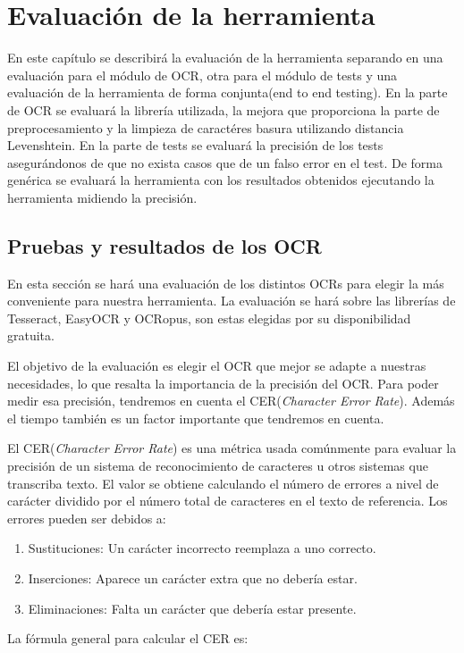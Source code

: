 \chapter{Evaluación de la herramienta}
\label{cap:evaluacion}

En este capítulo se describirá la evaluación de la herramienta separando en una evaluación para el módulo de OCR, otra para el módulo de tests y una evaluación de la herramienta de forma conjunta(end to end testing).
En la parte de OCR se evaluará la librería utilizada, la mejora que proporciona la parte de preprocesamiento y la limpieza de caractéres basura utilizando distancia Levenshtein.
En la parte de tests se evaluará la precisión de los tests asegurándonos de que no exista casos que de un falso error en el test. 
De forma genérica se evaluará la herramienta con los resultados obtenidos ejecutando la herramienta midiendo la precisión.

\section{Pruebas y resultados de los OCR}
\label{sec:Evaluación_OCR}
En esta sección se hará una evaluación de los distintos OCRs para elegir la más conveniente para nuestra herramienta.
La evaluación se hará sobre las librerías de Tesseract, EasyOCR y OCRopus, son estas elegidas por su disponibilidad gratuita.

El objetivo de la evaluación es elegir el OCR que mejor se adapte a nuestras necesidades, lo que resalta la importancia de la precisión del OCR.
Para poder medir esa precisión, tendremos en cuenta el CER(\textit{Character Error Rate}). Además el tiempo también es un factor importante que tendremos en cuenta.

El CER(\textit{Character Error Rate}) es una métrica usada comúnmente para evaluar la precisión de un sistema de reconocimiento de caracteres u otros sistemas que transcriba texto. El valor se obtiene calculando el número de errores a nivel de carácter dividido por el número total de caracteres en el texto de referencia.
Los errores pueden ser debidos a:
\begin{enumerate}
	\item Sustituciones: Un carácter incorrecto reemplaza a uno correcto.
	\item Inserciones: Aparece un carácter extra que no debería estar.
	\item Eliminaciones: Falta un carácter que debería estar presente.
\end{enumerate}
La fórmula general para calcular el CER es:

